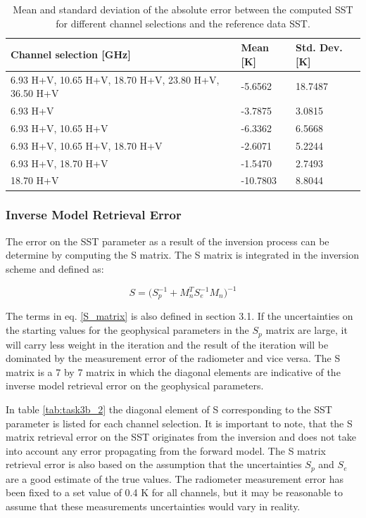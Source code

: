 \documentclass[11pt, a4paper]{article}
\begin{document}
\begin{table}[h!]
	\centering
	\begin{tabular}{@{}p{8cm}p{3cm}p{3cm}@{}}
		Channel selection [GHz] & Mean [K] & Std. Dev. [K] 
		\tabularnewline
		\midrule
		6.93 H+V, 10.65 H+V, 18.70 H+V, 23.80 H+V, 36.50 H+V & -5.6562 &  18.7487	\\
		6.93 H+V	& -3.7875	&  3.0815 \\
		6.93 H+V, 10.65 H+V	& -6.3362	&  6.5668 \\
		6.93 H+V, 10.65 H+V, 18.70 H+V	& -2.6071 &	5.2244	\\
		6.93 H+V, 18.70 H+V	& -1.5470 & 2.7493	\\
		18.70 H+V	& -10.7803 & 8.8044 \\
		\midrule
	\end{tabular}
	\caption{Mean and standard deviation of the absolute error between the computed SST for different channel selections and the reference data SST.}
	\label{tab:task3b_1}
\end{table}

\subsubsection{Inverse Model Retrieval Error}
The error on the SST parameter as a result of the inversion process can be determine by computing the S matrix. The S matrix is integrated in the inversion scheme and defined as: 

\begin{equation*}
S =
\Big(S_p^{-1} + M_n^T S_e^{-1} M_n \Big)^{-1}  
\label{S_matrix}
\end{equation*}

The terms in eq. \ref{S_matrix} is also defined in section 3.1. If the uncertainties on the starting values for the geophysical parameters in the \(S_p\) matrix are large, it will carry less weight in the iteration and the result of the iteration will be dominated by the measurement error of the radiometer and vice versa. The S matrix is a 7 by 7 matrix in which the diagonal elements are indicative of the inverse model retrieval error on the geophysical parameters. 
\newline

In table \ref{tab:task3b_2} the diagonal element of S corresponding to the SST parameter is listed for each channel selection. It is important to note, that the S matrix retrieval error on the SST originates from the inversion and does not take into account any error propagating from the forward model. The S matrix retrieval error is also based on the assumption that the uncertainties \(S_p\) and \(S_e\) are a good estimate of the true values. The radiometer measurement error has been fixed to a set value of 0.4 K for all channels, but it may be reasonable to assume that these measurements uncertainties would vary in reality.  
\end{document}
